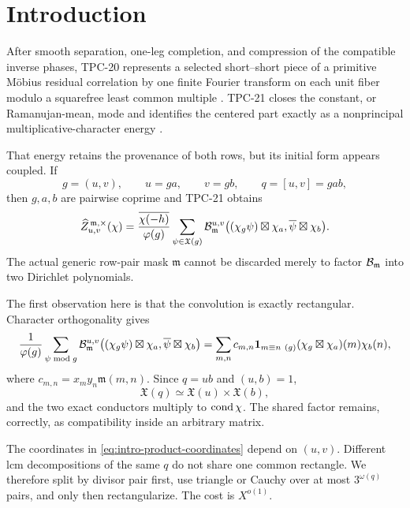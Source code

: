 \section{Introduction}
\label{sec:introduction}

After smooth separation, one-leg completion, and compression of the
compatible inverse phases, TPC-20 represents a selected short--short
piece of a primitive M\"obius residual correlation by one finite Fourier
transform on each unit fiber modulo a squarefree least common multiple
\citep{WangTPC18,WangTPC20}.  TPC-21 closes the constant, or
Ramanujan-mean, mode and identifies the centered part exactly as a
nonprincipal multiplicative-character energy \citep{WangTPC21}.

That energy retains the provenance of both rows, but its initial form
appears coupled.  If
\[
 g=(u,v),\qquad u=ga,\qquad v=gb,\qquad q=[u,v]=gab,
\]
then \(g,a,b\) are pairwise coprime and TPC-21 obtains
\begin{equation}
 \widehat Z_{u,v}^{\,\mathfrak m,\times}(\chi)
 =\frac{\overline{\chi(-h)}}{\varphi(g)}
 \sum_{\psi\in\mathfrak X(g)}
 \mathcal B_{\mathfrak m}^{u,v}
 \bigl((\chi_g\psi)\boxtimes\chi_a,
       \overline\psi\boxtimes\chi_b\bigr).
 \label{eq:intro-shared-convolution}
\end{equation}
The actual generic row-pair mask \(\mathfrak m\) cannot be discarded
merely to factor \(\mathcal B_{\mathfrak m}\) into two Dirichlet polynomials.

The first observation here is that the convolution is exactly
rectangular.  Character orthogonality gives
\begin{equation}
 \frac1{\varphi(g)}\sum_{\psi\bmod g}
 \mathcal B_{\mathfrak m}^{u,v}
 \bigl((\chi_g\psi)\boxtimes\chi_a,
       \overline\psi\boxtimes\chi_b\bigr)
 =\sum_{m,n}c_{m,n}\mathbf 1_{m\equiv n\ (g)}
   (\chi_g\boxtimes\chi_a)(m)\chi_b(n),
 \label{eq:intro-rectangularization}
\end{equation}
where \(c_{m,n}=x_my_n\mathfrak m(m,n)\).  Since \(q=ub\) and
\((u,b)=1\),
\begin{equation}
 \mathfrak X(q)\simeq\mathfrak X(u)\times\mathfrak X(b),
 \label{eq:intro-product-coordinates}
\end{equation}
and the two exact conductors multiply to \(\operatorname{cond}\chi\).  The shared
factor remains, correctly, as compatibility inside an arbitrary matrix.

The coordinates in \eqref{eq:intro-product-coordinates} depend on
\((u,v)\).  Different lcm decompositions of the same \(q\) do not share
one common rectangle.  We therefore split by divisor pair first, use
triangle or Cauchy over at most \(3^{\omega(q)}\) pairs, and only then
rectangularize.  The cost is \(X^{o(1)}\).

